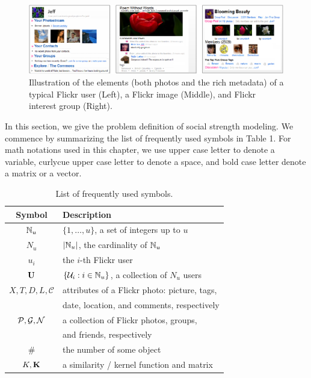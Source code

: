 \begin{figure}[!t]
\includegraphics[width=\linewidth]{figures/mm_sample.eps}
\caption{Illustration of the elements (both photos and the rich metadata) of a typical Flickr user (Left), a Flickr image (Middle), and Flickr interest group
(Right). }
\end{figure}

In this section, we give the problem definition of social strength modeling. We commence by summarizing the list of frequently used symbols in Table 1. For math notations used in this chapter, we use upper case letter to denote a variable, curlycue upper case letter to denote a space, and bold case letter denote a matrix or a vector.

\begin{table}[h]
\label{table:notation}
\begin{center}
\caption{List of frequently used symbols.}
\begin{tabular}{|c|l|}
\hline
Symbol & Description\\
\hline
\hline
${\mathbb N}_u$ &$\{1,\ldots,u\}$, a set of integers up to $u$\\
$N_u$ &$|{\mathbb N}_u|$, the cardinality of ${\mathbb N}_u$\\

$u_i$ & the $i$-th Flickr user\\
${\bf U}$ &$\{{\cal U}_i: i\in{\mathbb N}_u\}$, a collection of $N_u$ users\\
$X,T,D,L,\mathcal C$ & attributes of a Flickr photo: picture, tags, \\
&date, location, and comments, respectively\\
$\mathcal P, {\mathcal G}, \mathcal N$ & a collection of Flickr photos, groups, \\
&and friends, respectively\\
$\#$ &the number of some object\\
$K,{\mathbf K}$ &a similarity / kernel function and matrix\\
\hline
\end{tabular}
\end{center}
\end{table}

